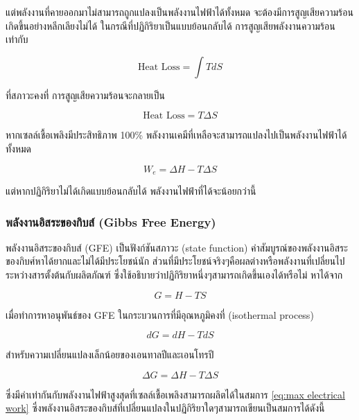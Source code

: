 \documentclass[11pt]{article}
\begin{document}
แต่พลังงานที่คายออกมาไม่สามารถถูกแปลงเป็นพลังงานไฟฟ้าได้ทั้งหมด จะต้องมีการสูญเสียความร้อนเกิดขึ้นอย่างหลีกเลียงไม่ได้ ในกรณีที่ปฏิกิริยาเป็นแบบย้อนกลับได้ การสูญเสียพลังงานความร้อนเท่ากับ

\begin{equation}
  \text{Heat Loss} = \int T dS
\end{equation}

ที่สภาวะคงที่ การสูญเสียความร้อนจะกลายเป็น

\begin{equation}
  \text{Heat Loss} = T \Delta S
\end{equation}

หากเซลล์เชื้อเพลิงมีประสิทธิภาพ 100\% พลังงานเคมีที่เหลือจะสามารถแปลงไปเป็นพลังงานไฟฟ้าได้ทั้งหมด

\begin{equation}
  \label{eq:max electrical work}
  W_e = \Delta H - T \Delta S
\end{equation}

แต่หากปฏิกิริยาไม่ได้เกิดแบบย้อนกลับได้ พลังงานไฟฟ้าที่ได้จะน้อยกว่านี้

\subsubsection{พลังงานอิสระของกิบส์ (Gibbs Free Energy)}
\label{sec:orgc4a6bfc}

พลังงานอิสระของกิบส์ (GFE) เป็นฟังก์ชันสภาวะ (state function) ค่าสัมบูรณ์ของพลังงานอิสระของกิบศ์หาได้ยากและไม่ได้มีประโยชน์นัก ส่วนที่มีประโยชน์จริงๆคือผลต่างหรือพลังงานที่เปลี่ยนไประหว่างสารตั้งต้นกับผลิตภัณฑ์ ซึ่งใช้อธิบายว่าปฏิกิริยาหนึ่งๆสามารถเกิดขึ้นเองได้หรือไม่ หาได้จาก

\begin{equation}
  \label{eq:gfe definition}
  G = H - TS
\end{equation}

เมื่อทำการหาอนุพันธ์ของ GFE ในกระบวนการที่มีอุณหภูมิคงที่ (isothermal process)

\begin{equation}
  \label{eq:gfe derivative}
  dG = dH - TdS
\end{equation}

สำหรับความเปลี่ยนแปลงเล็กน้อยของเอนทาลปีและเอนโทรปี

\begin{equation}
  \label{eq:gfe changes}
  \Delta G = \Delta H - T \Delta S
\end{equation}

ซึ่งมีค่าเท่ากันกับพลังงานไฟฟ้าสูงสุดที่เซลล์เชื้อเพลิงสามารถผลิตได้ในสมการ \ref{eq:max electrical work} ซึ่งพลังงานอิสระของกิบส์ที่เปลี่ยนแปลงในปฏิกิริยาใดๆสามารถเขียนเป็นสมการได้ดังนี้
\end{document}
